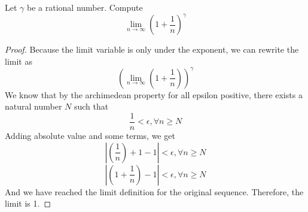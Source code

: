 \documentclass[boxes]{rutgers_hw}
\author{Rohan Karamel}
\date{\today}
\begin{document}
  \maketitle

  \pagebreak

  \begin{exern}{1}
    Let $\gamma$ be a rational number. Compute
    \[ \lim_{n\to\infty}{\left(1 + \frac1n\right)}^\gamma\]
  \end{exern}

  \begin{proof}
    Because the limit variable is only under the exponent, we can rewrite the limit as
    \[{\left( \lim_{n\to\infty} \left(1 + \frac1n\right) \right)}^\gamma \]
    We know that by the archimedean property for all epsilon positive, there exists a natural number $N$ such that
    \[ \frac1n < \epsilon, \forall n \ge N\]
    Adding absolute value and some terms, we get
    \[ \left|\left(\frac1n\right) + 1 - 1 \right| < \epsilon, \forall n \ge N \]
    \[ \left|\left(1 + \frac1n\right) - 1 \right| < \epsilon, \forall n \ge N\]
    And we have reached the limit definition for the original sequence.
    Therefore, the limit is 1.
  \end{proof}
\end{document}
